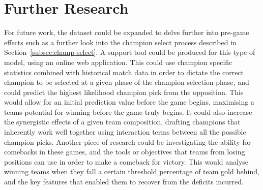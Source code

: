 \section{Further Research}\label{sec:Further Research}

For future work, the dataset could be expanded to delve further into pre-game effects such as a further look into the champion select process described in Section~\ref{subsec:champ-select}.
A support tool could be produced for this type of model, using an online web application.
This could use champion specific statistics combined with historical match data in order to dictate the correct champion to be selected at a given phase of the champion selection phase, and could predict the highest likelihood champion pick from the opposition.
This would allow for an initial prediction value before the game begins, maximising a teams potential for winning before the game truly begins.
It could also increase the synergistic effects of a given team composition, drafting champions that inherently work well together using interaction terms between all the possible champion picks.
Another piece of research could be investigating the ability for comebacks in these games, and the tools or objectives that teams from losing positions can use in order to make a comeback for victory.
This would analyse winning teams when they fall a certain threshold percentage of team gold behind, and the key features that enabled them to recover from the deficits incurred.
